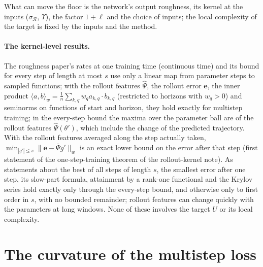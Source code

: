 \documentclass[11pt]{article}
\theoremstyle{definition}
\theoremstyle{remark}
\newcommand{\ee}{\mathbf{e}}
\newcommand{\Rgh}{\mathcal{R}}
\newcommand{\Psih}{\hat\Psi}
\begin{document}
What can move the floor is the network's output roughness, its kernel at the inputs ($\sigma_\Rgh$, $\Upsilon$), the factor $1+\ell$ and the choice of inputs; the local complexity of the target is fixed by the inputs and the method.

\paragraph{The kernel-level results.}
The roughness paper's rates at one training time (continuous time) and its bound for every step of length at most $s$ use only a linear map from parameter steps to sampled functions; with the rollout features $\Psih$, the rollout error $\ee$, the inner product $\langle a,b\rangle_w=\frac1n\sum_{k,q}w_qa_{k,q}\cdot b_{k,q}$ (restricted to horizons with $w_q>0$) and seminorms on functions of start and horizon, they hold exactly for multistep training; in the every-step bound the maxima over the parameter ball are of the rollout features $\Psih(\theta')$, which include the change of the predicted trajectory.
With the rollout features averaged along the step actually taken, $\min_{|g'|\le s}\|\ee-\bar\Psi g'\|_w$ is an exact lower bound on the error after that step (first statement of the one-step-training theorem of the rollout-kernel note).
As statements about the best of all steps of length $s$, the smallest error after one step, its slow-part formula, attainment by a rank-one functional and the Krylov series hold exactly only through the every-step bound, and otherwise only to first order in $s$, with no bounded remainder; rollout features can change quickly with the parameters at long windows.
None of these involves the target $U$ or its local complexity.

\section{The curvature of the multistep loss}\label{sec:curvature}
\end{document}
